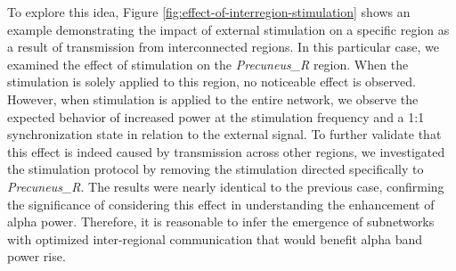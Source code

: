 \documentclass[../main.tex]{subfiles}
\begin{document}
To explore this idea, Figure \ref{fig:effect-of-interregion-stimulation} shows an example demonstrating the impact of external stimulation on a specific region as a result of transmission from interconnected regions.
In this particular case, we examined the effect of stimulation on the \textit{Precuneus\_R} region.
When the stimulation is solely applied to this region, no noticeable effect is observed.
However, when stimulation is applied to the entire network, we observe the expected behavior of increased power at the stimulation frequency and a 1:1 synchronization state in relation to the external signal.
To further validate that this effect is indeed caused by transmission across other regions, we investigated the stimulation protocol by removing the stimulation directed specifically to \textit{Precuneus\_R}.
The results were nearly identical to the previous case, confirming the significance of considering this effect in understanding the enhancement of alpha power.
Therefore, it is reasonable to infer the emergence of subnetworks with optimized inter-regional communication that would benefit alpha band power rise.
\clearpage
\end{document}
